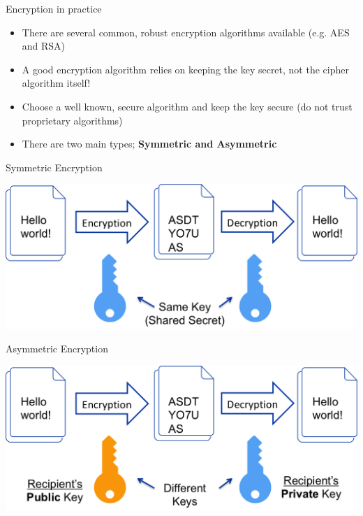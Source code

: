 \documentclass[aspectratio=169]{beamer}
\begin{document}
\begin{frame}{Encryption in practice}
\begin{itemize}
\item There are several common, robust encryption algorithms available (e.g. AES and RSA) 
\item A good encryption algorithm relies on keeping the key secret, not the cipher algorithm itself!
\item Choose a well known, secure algorithm and keep the key secure (do not trust proprietary algorithms)
\item There are two main types; \textbf{Symmetric and Asymmetric} 
\end{itemize}
\end{frame}

\begin{frame}{Symmetric Encryption}
\begin{center}
\includegraphics[width=0.8\linewidth]{symmetric-encryption.png}
\end{center}
\end{frame}

\begin{frame}{Asymmetric Encryption}
\begin{center}
\includegraphics[width=0.8\linewidth]{asymmetric-encryption.png}
\end{center}
\end{frame}
\end{document}
